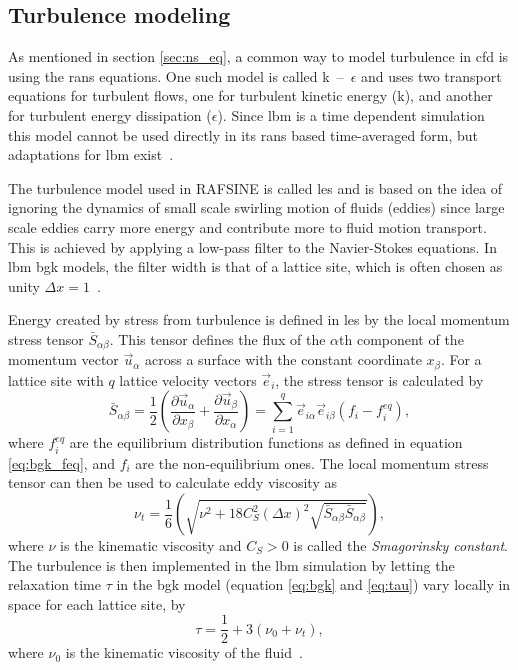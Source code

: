 \subsection{Turbulence modeling}\label{sec:turbulence_modeling}
As mentioned in section \ref{sec:ns_eq}, a common way to model turbulence in \gls{cfd} is using the \gls{rans} equations. One such model is called k~--~$\epsilon$ and uses two transport equations for turbulent flows, one for turbulent kinetic energy (k), and another for turbulent energy dissipation ($\epsilon$). Since \gls{lbm} is a time dependent simulation this model cannot be used directly in its \gls{rans} based time-averaged form, but adaptations for \gls{lbm} exist~\cite{lbm_challenges}.

The turbulence model used in RAFSINE is called \gls{les} and is based on the idea of ignoring the dynamics of small scale swirling motion of fluids (eddies) since large scale eddies carry more energy and contribute more to fluid motion transport. This is achieved by applying a low-pass filter to the Navier-Stokes equations. In \gls{lbm} \gls{bgk} models, the filter width is that of a lattice site, which is often chosen as unity $\Delta x=1$~\cites[pg.51]{Delbosc}.

Energy created by stress from turbulence is defined in \gls{les} by the local momentum stress tensor $\bar{S}_{\alpha \beta}$. This tensor defines the flux of the $\alpha$th component of the momentum vector $\vec{u}_{\alpha}$ across a surface with the constant coordinate $x_{\beta}$. For a lattice site with $q$ lattice velocity vectors $\vec{e}_i$, the stress tensor is calculated by 
\begin{equation}
\bar{S}_{\alpha \beta} 
=
\frac{1}{2} \left( 
\frac{\partial \vec{u}_{\alpha}}{\partial x_{\beta}}
+
\frac{\partial \vec{u}_{\beta}}{\partial x_{\alpha}}
\right)
= 
\sum\limits_{i=1}^{q} \vec{e}_{i\alpha} \vec{e}_{i\beta} \left( f_i - f^{eq}_i \right),
\end{equation}
where $f^{eq}_i$ are the equilibrium distribution functions as defined in equation \ref{eq:bgk_feq}, and $f_i$ are the non-equilibrium ones. The local momentum stress tensor can then be used to calculate eddy viscosity as
\begin{equation}
\nu_t = \frac{1}{6} \left( \sqrt{\nu^2 + 18 C_S^2 (\Delta x)^2 \sqrt{\bar{S}_{\alpha \beta}\bar{S}_{\alpha \beta}}} \right),
\end{equation}
where $\nu$ is the kinematic viscosity and $C_S > 0$ is called the \textit{Smagorinsky constant}. The turbulence is then implemented in the \gls{lbm} simulation by letting the relaxation time $\tau$ in the \gls{bgk} model (equation \ref{eq:bgk} and \ref{eq:tau}) vary locally in space for each lattice site, by
\begin{equation}
\tau = \frac{1}{2}+3(\nu_0+\nu_t),
\end{equation}
where $\nu_0$ is the kinematic viscosity of the fluid~\cites[pg.51]{Delbosc}.

